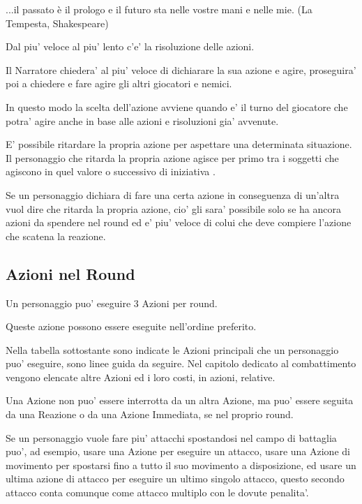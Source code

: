 \documentclass[a4paper,11pt,twoside,openany]{dndbook}
\begin{document}
\begin{quotebox}
...il passato è il prologo e il futuro sta nelle vostre mani e nelle mie. (La Tempesta, Shakespeare)
\end{quotebox}


\label{risoluzione-delle-azioni}

Dal piu' veloce al piu' lento c'e' la risoluzione delle azioni.

Il Narratore chiedera' al piu' veloce di dichiarare la sua azione e agire, proseguira' poi a chiedere e fare agire gli altri giocatori e nemici.

In questo modo la scelta dell'azione avviene quando e' il turno del giocatore che potra' agire anche in base alle azioni e risoluzioni gia' avvenute.

E' possibile ritardare la propria azione per aspettare una determinata situazione. Il personaggio che ritarda la propria azione agisce per primo tra i soggetti che agiscono in quel valore o successivo di iniziativa .

Se un personaggio dichiara di fare una certa azione in conseguenza di un'altra vuol dire che ritarda la propria azione, cio' gli sara' possibile solo se ha ancora azioni da spendere nel round ed e' piu' veloce di colui che deve compiere l'azione che scatena la reazione.

\subsection{Azioni nel Round}

\label{azioni-nel-round}

Un personaggio puo' eseguire 3 Azioni per round.

Queste azione possono essere eseguite nell'ordine preferito.

Nella tabella sottostante sono indicate le Azioni principali che un personaggio puo' eseguire, sono linee guida da seguire. Nel capitolo dedicato al combattimento vengono elencate altre Azioni ed i loro costi, in azioni, relative.

Una Azione non puo' essere interrotta da un altra Azione, ma puo' essere seguita da una Reazione o da una Azione Immediata, se nel proprio round.

Se un personaggio vuole fare piu' attacchi spostandosi nel campo di battaglia puo', ad esempio, usare una Azione per eseguire un attacco, usare una Azione di movimento per spostarsi fino a tutto il suo movimento a disposizione, ed usare un ultima azione di attacco per eseguire un ultimo singolo attacco, questo secondo attacco conta comunque come attacco multiplo con le dovute penalita'.
\end{document}
